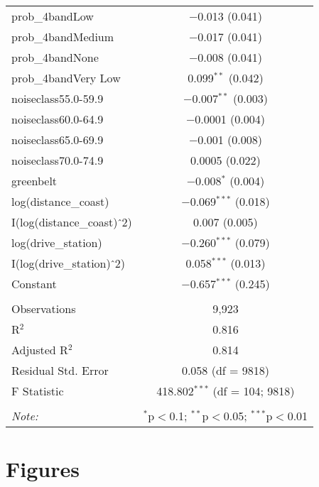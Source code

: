 \documentclass{article}\usepackage[]{graphicx}\usepackage[]{color}
\makeatletter
\newenvironment{kframe}{%
 \def\at@end@of@kframe{}%
 \ifinner\ifhmode%
  \def\at@end@of@kframe{\end{minipage}}%
  \begin{minipage}{\columnwidth}%
 \fi\fi%
 \def\FrameCommand##1{\hskip\@totalleftmargin \hskip-\fboxsep
 \colorbox{shadecolor}{##1}\hskip-\fboxsep
     \hskip-\linewidth \hskip-\@totalleftmargin \hskip\columnwidth}%
 \MakeFramed {\advance\hsize-\width
   \@totalleftmargin\z@ \linewidth\hsize
   \@setminipage}}%
 {\par\unskip\endMakeFramed%
 \at@end@of@kframe}
\newenvironment{knitrout}{}{} %
\makeatother
\begin{document}
\begin{table}[!htbp]
\begin{tabular}{@{\extracolsep{5pt}}lc}
  prob\_4bandLow & $-$0.013 (0.041) \\ 
  prob\_4bandMedium & $-$0.017 (0.041) \\ 
  prob\_4bandNone & $-$0.008 (0.041) \\ 
  prob\_4bandVery Low & 0.099$^{**}$ (0.042) \\ 
  noiseclass55.0-59.9 & $-$0.007$^{**}$ (0.003) \\ 
  noiseclass60.0-64.9 & $-$0.0001 (0.004) \\ 
  noiseclass65.0-69.9 & $-$0.001 (0.008) \\ 
  noiseclass70.0-74.9 & 0.0005 (0.022) \\ 
  greenbelt & $-$0.008$^{*}$ (0.004) \\ 
  log(distance\_coast) & $-$0.069$^{***}$ (0.018) \\ 
  I(log(distance\_coast)$\hat{\mkern6mu}$2) & 0.007 (0.005) \\ 
  log(drive\_station) & $-$0.260$^{***}$ (0.079) \\ 
  I(log(drive\_station)$\hat{\mkern6mu}$2) & 0.058$^{***}$ (0.013) \\ 
  Constant & $-$0.657$^{***}$ (0.245) \\ 
 \hline \\[-1.8ex] 
Observations & 9,923 \\ 
R$^{2}$ & 0.816 \\ 
Adjusted R$^{2}$ & 0.814 \\ 
Residual Std. Error & 0.058 (df = 9818) \\ 
F Statistic & 418.802$^{***}$ (df = 104; 9818) \\ 
\hline 
\hline \\[-1.8ex] 
\textit{Note:}  & \multicolumn{1}{r}{$^{*}$p$<$0.1; $^{**}$p$<$0.05; $^{***}$p$<$0.01} \\ 
\end{tabular} 
\end{table} 

\pagebreak
\section{Figures}


\begin{knitrout}\scriptsize
{}\color{fgcolor}\begin{kframe}


{\ttfamily\noindent\bfseries\color{errorcolor}{Error in density(deltadrivetime[, i1], na.rm = TRUE): object 'deltadrivetime' not found}}\end{kframe}
\end{knitrout}
\end{document}
